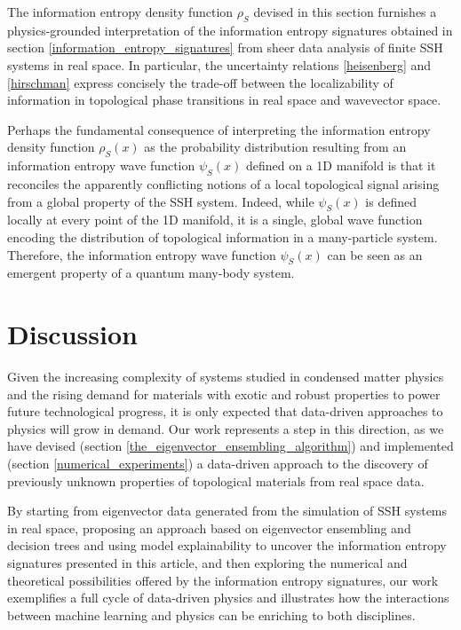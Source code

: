 \documentclass[10pt]{revtex4-1}
\begin{document}
The information entropy density function $\rho_S$ devised in this section furnishes a physics-grounded interpretation of the information entropy signatures obtained in section \ref{information_entropy_signatures} from sheer data analysis of finite SSH systems in real space. In particular, the uncertainty relations \eqref{heisenberg} and \eqref{hirschman} express concisely the trade-off between the localizability of information in topological phase transitions in real space and wavevector space. 

Perhaps the fundamental consequence of interpreting the information entropy density function $\rho_S(x)$ as the probability distribution resulting from an information entropy wave function $\psi_S(x)$ defined on a 1D manifold is that it reconciles the apparently conflicting notions of a local topological signal arising from a global property of the SSH system. Indeed, while $\psi_S(x)$ is defined locally at every point of the 1D manifold, it is a single, global wave function encoding the distribution of topological information in a many-particle system. Therefore, the information entropy wave function $\psi_S(x)$ can be seen as an emergent property of a quantum many-body system.    

\section{Discussion}
\label{discussion}

Given the increasing complexity of systems studied in condensed matter physics and the rising demand for materials with exotic and robust properties to power future technological progress, it is only expected that data-driven approaches to physics will grow in demand. Our work represents a step in this direction, as we have devised (section \ref{the_eigenvector_ensembling_algorithm}) and implemented (section \ref{numerical_experiments}) a data-driven approach to the discovery of previously unknown properties of topological materials from real space data.

By starting from eigenvector data generated from the simulation of SSH systems in real space, proposing an approach based on eigenvector ensembling and decision trees and using model explainability to uncover the information entropy signatures presented in this article, and then exploring the numerical and theoretical possibilities offered by the information entropy signatures, our work exemplifies a full cycle of data-driven physics and illustrates how the interactions between machine learning and physics can be enriching to both disciplines.      
 
\end{document}
